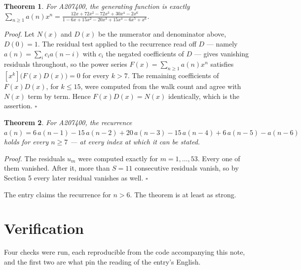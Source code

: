 \documentclass[11pt]{article}
\newtheorem{theorem}{Theorem}
\theoremstyle{definition}
\begin{document}
\begin{theorem} For A207400, the generating function is exactly $\sum_{n\ge 1} a(n)x^n = \frac{12x + 72x^{2} - 72x^{3} + 30x^{4} - 2x^{6}}{1 - 6x + 15x^{2} - 20x^{3} + 15x^{4} - 6x^{5} + x^{6}}$.\end{theorem}

{\itshape Proof.} Let $N(x)$ and $D(x)$ be the numerator and denominator above, $D(0)=1$. The residual test applied to the recurrence read off $D$ --- namely $a(n) = \sum_i c_i a(n-i)$ with $c_i$ the negated coefficients of $D$ --- gives vanishing residuals throughout, so the power series $F(x)=\sum_{n\ge 1}a(n)x^n$ satisfies $[x^k]\bigl(F(x)D(x)\bigr) = 0$ for every $k > 7$. The remaining coefficients of $F(x)D(x)$, for $k \le 15$, were computed from the walk count and agree with $N(x)$ term by term. Hence $F(x)D(x) = N(x)$ identically, which is the assertion. $\square$

\begin{theorem} For A207400, the recurrence $a(n) = 6\,a(n-1) - 15\,a(n-2) + 20\,a(n-3) - 15\,a(n-4) + 6\,a(n-5) - a(n-6)$ holds for every $n \ge 7$ --- at every index at which it can be stated.\end{theorem}

{\itshape Proof.} The residuals $u_m$ were computed exactly for $m = 1,\dots,53$. Every one of them vanished. After it, more than $S = 11$ consecutive residuals vanish, so by Section 5 every later residual vanishes as well. $\square$

The entry claims the recurrence for $n > 6$. The theorem is at least as strong.

\section{Verification}

Four checks were run, each reproducible from the code accompanying this note, and the first two are what pin the reading of the entry's English.
\end{document}
